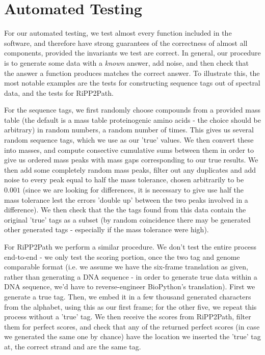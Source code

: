 \documentclass{l4proj}
\begin{document}
\section{Automated Testing}

For our automated testing, we test almost every function included in the software, and therefore have strong guarantees of the correctness of almost all components, provided the invariants we test are correct. In general, our procedure is to generate some data with a \textit{known} answer, add noise, and then check that the answer a function produces matches the correct answer. To illustrate this, the most notable examples are the tests for constructing sequence tags out of spectral data, and the tests for RiPP2Path.

For the sequence tags, we first randomly choose compounds from a provided mass table (the default is a mass table proteinogenic amino acids - the choice should be arbitrary) in random numbers, a random number of times. This gives us several random sequence tags, which we use as our 'true' values. We then convert these into masses, and compute consective cumulative sums between them in order to give us ordered mass peaks with mass gaps corresponding to our true results. We then add some completely random mass peaks, filter out any duplicates and add noise to every peak equal to half the mass tolerance, chosen arbitrarily to be \(0.001\) (since we are looking for differences, it is necessary to give use half the mass tolerance lest the errors 'double up' between the two peaks involved in a difference). We then check that the the tags found from this data contain the original 'true' tags as a subset (by random coincidence there may be generated other generated tags - especially if the mass tolerance were high).

For RiPP2Path we perform a similar procedure. We don't test the entire process end-to-end - we only test the scoring portion, once the two tag and genome comparable format (i.e. we assume we have the six-frame translation as given, rather than generating a DNA sequence - in order to generate true data within a DNA sequence, we'd have to reverse-engineer BioPython's translation). First we generate a true tag. Then, we embed it in a few thousand generated characters from the alphabet, using this as our first frame; for the other five, we repeat this process without a 'true' tag. We then receive the scores from RiPP2Path, filter them for perfect scores, and check that any of the returned perfect scores (in case we generated the same one by chance) have the location we inserted the 'true' tag at, the correct strand and are the same tag.
\end{document}
